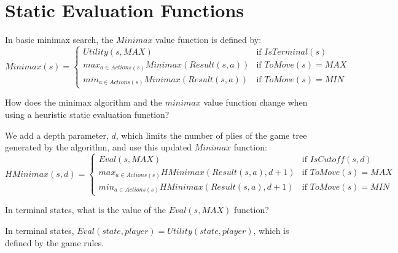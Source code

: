 \vspace{-.25in}

\section{Static Evaluation Functions}

\begin{questions}

\question In basic minimax search, the $Minimax$ value function is defined by:
\vspace{-.1in}
\[
Minimax(s) =
\begin{cases}
Utility(s,MAX)                              & \text{if } IsTerminal(s) \\
max_{a \in Actions(s)} Minimax(Result(s,a)) & \text{if } ToMove(s) = MAX \\
min_{a \in Actions(s)} Minimax(Result(s,a)) & \text{if } ToMove(s) = MIN
\end{cases}
\]

How does the minimax algorithm and the $minimax$ value function change when using a heuristic static evaluation function?

\begin{solution}[2in]
We add a depth parameter, $d$, which limits the number of plies of the game tree generated by the algorithm, and use this updated $Minimax$ function:
\vspace{-.1in}
\[
HMinimax(s, d) =
\begin{cases}
Eval(s,MAX)                                        & \text{if } IsCutoff(s, d) \\
max_{a \in Actions(s)} HMinimax(Result(s,a), d+1) & \text{if } ToMove(s) = MAX \\
min_{a \in Actions(s)} HMinimax(Result(s,a), d+1) & \text{if } ToMove(s) = MIN
\end{cases}
\]
\vspace{-.1in}
\end{solution}

\question In terminal states, what is the value of the $Eval(s, MAX)$ function?

\begin{solution}[.5in]
In terminal states, $Eval(state, player) = Utility(state, player)$, which is defined by the game rules.
\end{solution}

\end{questions}

\newpage


